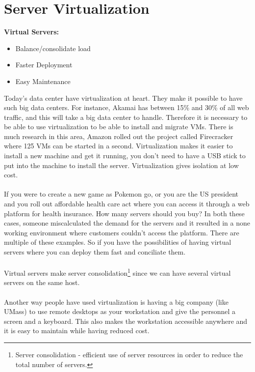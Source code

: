 \documentclass[twoside]{article}
\begin{document}
\section{Server Virtualization}
\textbf{Virtual Servers:} 
\begin{itemize}
  \item Balance/consolidate load
  \item Faster Deployment
  \item Easy Maintenance
\end{itemize}
Today's data center have virtualization at heart. They make it possible to have such big data centers. For instance, Akamai has between 15\% and 30\% of all web traffic, and this will take a big data center to handle. Therefore it is necessary to be able to use virtualization to be able to install and migrate VMs. There is much research in this area, Amazon rolled out the project called Firecracker where 125 VMs can be started in a second. Virtualization makes it easier to install a new machine and get it running, you don't need to have a USB stick to put into the machine to install the server. Virtualization gives isolation at low cost.
\\\\
If you were to create a new game as Pokemon go, or you are the US president and you roll out affordable health care act where you can access it through a web platform for health insurance. How many servers should you buy? In both these cases, someone miscalculated the demand for the servers and it resulted in a none working environment where customers couldn't access the platform. There are multiple of these examples. So if you have the possibilities of having virtual servers where you can deploy them fast and conciliate them. 
\\\\
Virtual servers make server consolidation\footnote{Server consolidation -  efficient use of server resources in order to reduce the total number of servers.} since we can have several virtual servers on the same host. 
\\\\
Another way people have used virtualization is having a big company (like UMass) to use remote desktops as your workstation and give the personnel a screen and a keyboard. This also makes the workstation accessible anywhere and it is easy to maintain while having reduced cost. 
\end{document}
